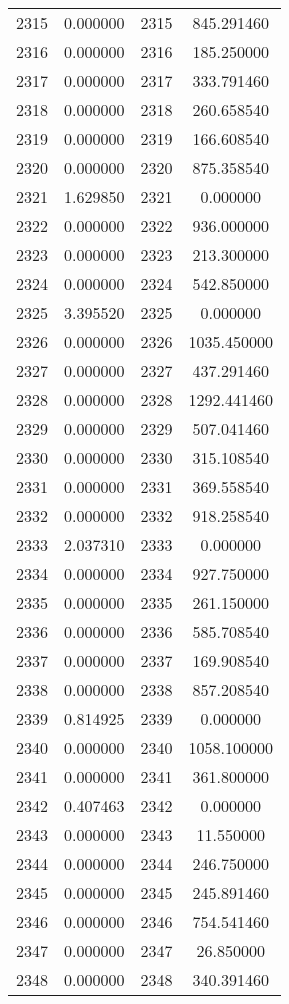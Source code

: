 \documentclass[12pt]{article}
\begin{document}
\begin{longtable}{@{}cccc@{}}
2315 & 0.000000 & 2315 & 845.291460 \\
2316 & 0.000000 & 2316 & 185.250000 \\
2317 & 0.000000 & 2317 & 333.791460 \\
2318 & 0.000000 & 2318 & 260.658540 \\
2319 & 0.000000 & 2319 & 166.608540 \\
2320 & 0.000000 & 2320 & 875.358540 \\
2321 & 1.629850 & 2321 & 0.000000 \\
2322 & 0.000000 & 2322 & 936.000000 \\
2323 & 0.000000 & 2323 & 213.300000 \\
2324 & 0.000000 & 2324 & 542.850000 \\
2325 & 3.395520 & 2325 & 0.000000 \\
2326 & 0.000000 & 2326 & 1035.450000 \\
2327 & 0.000000 & 2327 & 437.291460 \\
2328 & 0.000000 & 2328 & 1292.441460 \\
2329 & 0.000000 & 2329 & 507.041460 \\
2330 & 0.000000 & 2330 & 315.108540 \\
2331 & 0.000000 & 2331 & 369.558540 \\
2332 & 0.000000 & 2332 & 918.258540 \\
2333 & 2.037310 & 2333 & 0.000000 \\
2334 & 0.000000 & 2334 & 927.750000 \\
2335 & 0.000000 & 2335 & 261.150000 \\
2336 & 0.000000 & 2336 & 585.708540 \\
2337 & 0.000000 & 2337 & 169.908540 \\
2338 & 0.000000 & 2338 & 857.208540 \\
2339 & 0.814925 & 2339 & 0.000000 \\
2340 & 0.000000 & 2340 & 1058.100000 \\
2341 & 0.000000 & 2341 & 361.800000 \\
2342 & 0.407463 & 2342 & 0.000000 \\
2343 & 0.000000 & 2343 & 11.550000 \\
2344 & 0.000000 & 2344 & 246.750000 \\
2345 & 0.000000 & 2345 & 245.891460 \\
2346 & 0.000000 & 2346 & 754.541460 \\
2347 & 0.000000 & 2347 & 26.850000 \\
2348 & 0.000000 & 2348 & 340.391460 \\

\end{longtable}
\end{document}
